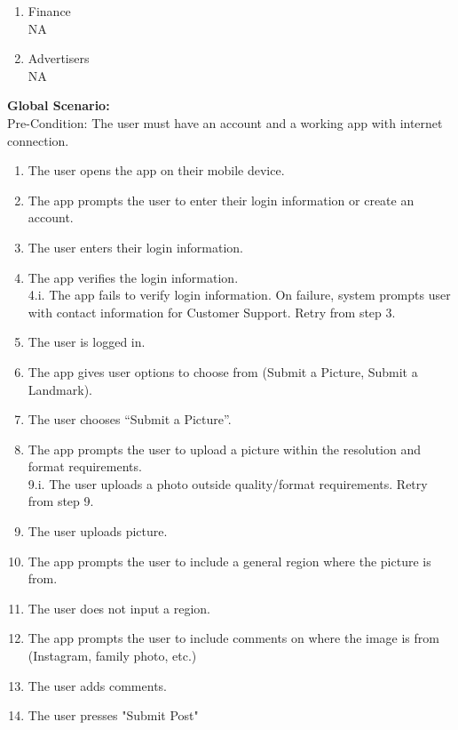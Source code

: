 \documentclass[]{article}
\begin{document}
\begin{enumerate}[{\bf BE1.}]
\begin{enumerate}[{\bf VP1.}]
            \item Finance \\
            NA
            \item Advertisers\\
            NA \\
		\end{enumerate}
		{\bf Global Scenario:}\\
            Pre-Condition: The user must have an account and a working app with internet connection. 
		      \begin{enumerate}[{1.}]
                    \item The user opens the app on their mobile device.
                        \item The app prompts the user to enter their login information or create an account.
                        \item The user enters their login information.
                        \item The app verifies the login information. \\ 4.i. The app fails to verify login information. On failure, system prompts user with contact information for Customer Support. Retry from step 3.
                        \item The user is logged in.
                        \item The app gives user options to choose from (Submit a Picture, Submit a Landmark). 
                        \item The user chooses “Submit a Picture”. 
                        \item The app prompts the user to upload a picture within the resolution and format requirements. \\ 9.i. The user uploads a photo outside quality/format requirements. Retry from step 9.\\
                        \item The user uploads picture.
                        \item The app prompts the user to include a general region where the picture is from. 
                        \item The user does not input a region. 
                        \item The app prompts the user to include comments on where the image is from (Instagram, family photo, etc.) 
                        \item The user adds comments.
                        \item The user presses "Submit Post"

\end{enumerate}
\end{enumerate}
\end{document}
